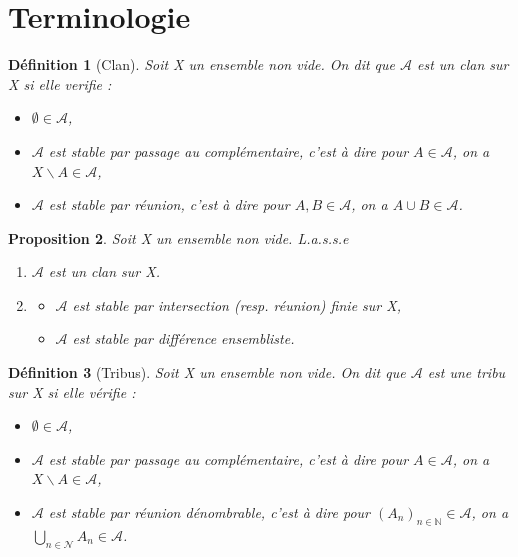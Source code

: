 \documentclass[a4paper,12pt,french]{report}
\theoremstyle{break}
\newtheorem{defin}{Définition}[section]
\newtheorem{prop}[defin]{Proposition}
\begin{document}
\section{Terminologie}
\begin{defin}[Clan]
      Soit X un ensemble non vide. On dit que $\mathcal{A}$ est un clan sur X si elle verifie :
      \begin{itemize}
             \item $\emptyset \in \mathcal{A}$,
             \item $\mathcal{A}$ est stable par passage au complémentaire, c'est à dire pour $A \in \mathcal{A}$, on a $X \backslash A \in \mathcal{A}$,
             \item $\mathcal{A}$ est stable par réunion, c'est à dire pour $A, B \in \mathcal{A}$, on a $A \cup B \in \mathcal{A}$.
      \end{itemize}
\end{defin}

\begin{prop}
	Soit X un ensemble non vide. L.a.s.s.e
	\begin{enumerate}
		\item $\mathcal{A}$ est un clan sur X.
		\item
			\begin{itemize}
				\item[i)] $\mathcal{A}$ est stable par intersection (resp. réunion) finie sur X,
				\item[ii)] $\mathcal{A}$ est stable par différence ensembliste.
			\end{itemize}
	\end{enumerate}
\end{prop}

\begin{defin}[Tribus]
      Soit X un ensemble non vide. On dit que $\mathcal{A}$ est une tribu sur X si elle vérifie :
      \begin{itemize}
             \item $\emptyset \in \mathcal{A}$,
             \item $\mathcal{A}$ est stable par passage au complémentaire, c'est à dire pour $A \in \mathcal{A}$, on a $X \backslash A \in \mathcal{A}$,
             \item $\mathcal{A}$ est stable par réunion dénombrable, c'est à dire pour $(A_{n})_{n \in \mathbb{N}} \in \mathcal{A}$, on a $\displaystyle \bigcup_{n \in \mathcal{N}} A_{n} \in \mathcal{A}$.
      \end{itemize}
\end{defin}
\end{document}
